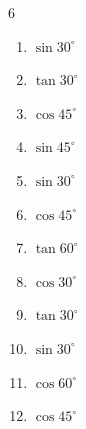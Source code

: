 \begin{multicols}{6}
\begin{enumerate}

  \item $\displaystyle \sin{30^\circ}$


  \item $\displaystyle \tan{30^\circ}$


  \item $\displaystyle \cos{45^\circ}$


  \item $\displaystyle \sin{45^\circ}$


  \item $\displaystyle \sin{30^\circ}$


  \item $\displaystyle \cos{45^\circ}$


  \item $\displaystyle \tan{60^\circ}$


  \item $\displaystyle \cos{30^\circ}$


  \item $\displaystyle \tan{30^\circ}$


  \item $\displaystyle \sin{30^\circ}$


  \item $\displaystyle \cos{60^\circ}$


  \item $\displaystyle \cos{45^\circ}$



\end{enumerate}
\end{multicols}
